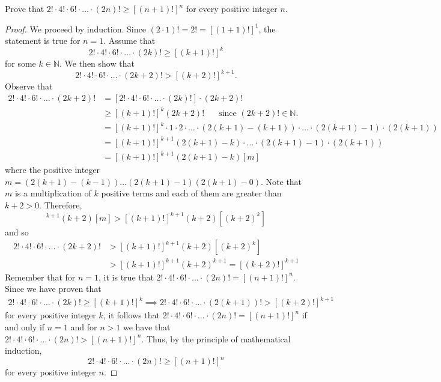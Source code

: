 \documentclass[12pt]{article}
\newcommand{\N}{\mathbb{N}}
\newenvironment{problem}[2][Problem]{\begin{trivlist}
		\item[\hskip \labelsep {\bfseries #1}\hskip \labelsep {\bfseries #2.}]}{\end{trivlist}}
\begin{document}
\begin{problem}{14}
	Prove that $2!\cdot 4!\cdot 6!\cdot \ldots \cdot (2n)! \geq [(n+1)!]^{n}$ for every positive integer $n$.
	\begin{proof}
		We proceed by induction. Since $(2\cdot 1)! = 2! = [(1+1)!]^{1}$, the statement is true for $n=1$. Assume that 
		\begin{equation*}
			2!\cdot 4!\cdot 6!\cdot \ldots \cdot (2k)! \geq [(k+1)!]^{k}
		\end{equation*}
	for some $k\in \N$. We then show that 
		\begin{equation*}
			2!\cdot 4!\cdot 6!\cdot \ldots \cdot (2k+2)! > [(k+2)!]^{k+1}. 
		\end{equation*}
	Observe that 
		\begin{align*}
			2!\cdot 4!\cdot 6!\cdot \ldots \cdot (2k+2)! &= \left[	2!\cdot 4!\cdot 6!\cdot \ldots \cdot (2k)!\right]\cdot (2k+2)!\\
			&\geq [(k+1)!]^{k} (2k+2)!  \;\;\;\;\; \text{ since } (2k+2)! \in \N.\\
			&= [(k+1)!]^{k}\cdot 1\cdot2\cdot \ldots \cdot (2(k+1)-(k+1))\cdot\ldots\cdot(2(k+1)-1)\cdot (2(k+1))\\
			&= [(k+1)!]^{k+1}(2(k+1)-k)\cdot \ldots \cdot (2(k+1)-1)\cdot (2(k+1))\\
			&= [(k+1)!]^{k+1}(2(k+1)-k)[m]
		\end{align*}
	where the positive integer $m = (2(k+1)-(k-1))\ldots(2(k+1)-1)(2(k+1)-0)$. Note that $m$ is a multiplication of $k$ positive terms and each of them are greater than $k+2>0$. Therefore,
	\begin{equation*}
		[(k+1)!]^{k+1}(k+2)[m] > [(k+1)!]^{k+1}(k+2)\left[(k+2)^{k}\right]
	\end{equation*}
	and so
	\begin{align*}
		2!\cdot 4!\cdot 6!\cdot \ldots \cdot (2k+2)! &> [(k+1)!]^{k+1}(k+2)\left[(k+2)^{k}\right]\\
		&>  [(k+1)!]^{k+1}(k+2)^{k+1} = [(k+2)!]^{k+1}
	\end{align*}
	Remember that for $n=1$, it is true that $2!\cdot 4!\cdot 6!\cdot \ldots \cdot (2n)! = [(n+1)!]^{n}$. Since we have proven that
	\begin{align*}
		2!\cdot 4!\cdot 6!\cdot \ldots \cdot (2k)! \geq [(k+1)!]^{k}\implies  2!\cdot 4!\cdot 6!\cdot \ldots \cdot (2(k+1))! > [(k+2)!]^{k+1}
	\end{align*}
	for every positive integer $k$, it follows that $2!\cdot 4!\cdot 6!\cdot \ldots \cdot (2n)! = [(n+1)!]^{n}$ if and only if $n=1$ and for $n>1$ we have that $2!\cdot 4!\cdot 6!\cdot \ldots \cdot (2n)! > [(n+1)!]^{n}$. Thus,
	by the principle of mathematical induction, 
	\begin{equation*}
		2!\cdot 4!\cdot 6!\cdot \ldots \cdot (2n)! \geq [(n+1)!]^{n}
	\end{equation*}
	for every positive integer $n$.
	\end{proof}
\end{problem} 
\end{document}
